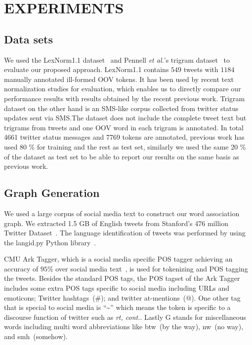 \documentclass[a4paper,onesided,12pt]{report}
\begin{document}
\chapter{EXPERIMENTS}
\label{sec:experiments}

\section{Data sets}
We used the LexNorm1.1 dataset~\cite{Han:2011:LNS:2002472.2002520} and Pennell \textit{et al.}'s trigram dataset~\cite{pennell2011character} to evaluate our proposed approach. LexNorm1.1 contains $549$ tweets with $1184$ manually annotated ill-formed OOV tokens. It has been used by recent text normalization studies for evaluation, which enables us to directly compare our performance results with results obtained by the recent previous work. Trigram dataset on the other hand is an SMS-like corpus collected from twitter status updates sent via SMS.\@ The dataset does not include the complete tweet text but trigrams from tweets and one OOV word in each trigram is annotated. In total 4661 twitter status messages and 7769 tokens are annotated, previous work has used 80 \% for training and the rest as test set, similarly we used the same 20 \% of the dataset as test set to be able to report our results on the same basis as previous work.

\section{Graph Generation}
We used a large corpus of social media text to construct our word association graph. We extracted 1.5 GB of English tweets from Stanford's 476 million Twitter Dataset~\cite{DBLP:conf/wsdm/YangL11}. The language identification of tweets was performed by using the langid.py Python library~\cite{Lui:2012:LOL:2390470.2390475, Baldwin:2010:LIL:1857999.1858026}.

CMU Ark Tagger, which is a social media specific POS tagger achieving an accuracy of $95\%$ over social media text~\cite{owoputi2013improved,Gimpel:2011:PTT:2002736.2002747}, is used for tokenizing and POS tagging the tweets. Besides the standard POS tags, the POS tagset of the Ark Tagger includes some extra POS tags specific to social media including URLs and emoticons; Twitter hashtags~(\#); and twitter at-mentions~(@). One other tag that is special to social media is ``\textasciitilde'' which means the token is specific to a discourse function of twitter such as \textit{rt, cont.}. Lastly G stands for miscellaneous words including multi word abbreviations like btw~(by the way), nw~(no way), and smh~(somehow).
\end{document}
